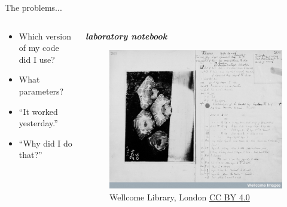 \documentclass[xcolor=svgnames,11pt]{beamer}
\begin{document}
\begin{frame}{The problems...  }


  \large
  \begin{columns}
    \begin{column}{0.4\textwidth}
      \vspace{-1.6cm}
      \begin{itemize}[leftmargin=2pt]
        \itemsep18pt
        \item<1->[] Which version of my code did I use?
        \item<2->[] What parameters?
        \item<3->[] \enquote{It worked yesterday.}
        \item<4->[] \enquote{Why did I do that?}
      \end{itemize}
    \end{column}
    \begin{column}{0.55\textwidth}
      \vspace{-1.cm}
      \begin{center}
        \textbf{\textit{laboratory notebook}}
      \end{center}
      \vspace{-0.95cm}
      \begin{figure}
        \centering

        \includegraphics{victor_horsely.jpg}
        \vspace{-0.28cm}
        \caption*{\tiny \textcopyright Wellcome Library, London 
             \href{http://creativecommons.org/licenses/by/4.0/}{CC BY
               4.0}}
      \end{figure}


\end{column}
\end{columns}
\end{frame}
\end{document}
